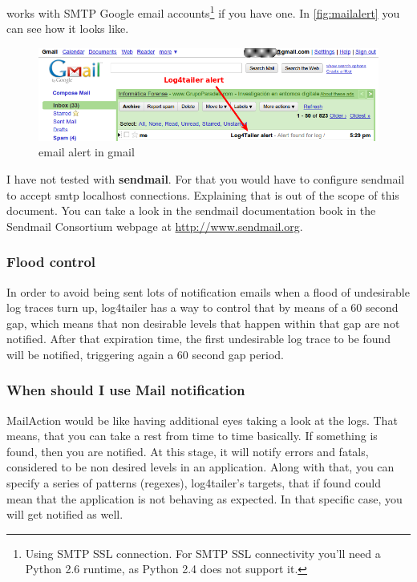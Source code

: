 \logftailer{} works with SMTP Google email accounts\footnote{Using SMTP SSL connection. For SMTP SSL
connectivity you'll need a Python 2.6 runtime, as Python 2.4 does not support it.} if you have one. 
In \autoref{fig:mailalert} you can see how it looks like.

\begin{figure}[hb]
\includegraphics[scale=0.55]{emailalert.png}
\caption{\logftailer{} email alert in gmail}\label{fig:mailalert}
\end{figure}


I have not tested \logftailer{} 
with \textbf{sendmail}. For that you would have to configure sendmail to accept smtp localhost connections. 
Explaining that is out of the scope of this document. You can take a look in the sendmail documentation 
book in the Sendmail Consortium webpage at \href{http://www.sendmail.org}{http://www.sendmail.org}.

\subsubsection{Flood control}
In order to avoid being sent lots of notification emails when a flood of undesirable log traces
turn up, log4tailer has a way to control that by means of a 60 second gap, which means that non desirable 
levels that happen within that gap are not notified. After that expiration time, the first undesirable log 
trace to be found will be notified, triggering again a 60 second gap period. 
 
\subsubsection{When should I use Mail notification}

MailAction would be like having additional eyes taking a look at the logs. That means, that you can take 
a rest from time to time basically. If something is found, then 
you are notified. At this stage, it will notify errors and fatals, considered to be non desired levels in 
an application. Along with that, you can specify a series of patterns (regexes), log4tailer's targets,
that if found could mean that the application is not behaving as expected. In that specific case, you will 
get notified as well.
  

